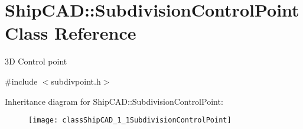 \hypertarget{classShipCAD_1_1SubdivisionControlPoint}{}\section{Ship\+C\+AD\+:\+:Subdivision\+Control\+Point Class Reference}
\label{classShipCAD_1_1SubdivisionControlPoint}


3D Control point  




{\ttfamily \#include $<$subdivpoint.\+h$>$}

Inheritance diagram for Ship\+C\+AD\+:\+:Subdivision\+Control\+Point\+:\begin{figure}[H]
\begin{center}
\leavevmode
\texttt{[image: classShipCAD\_1\_1SubdivisionControlPoint]}
\end{center}
\end{figure}
